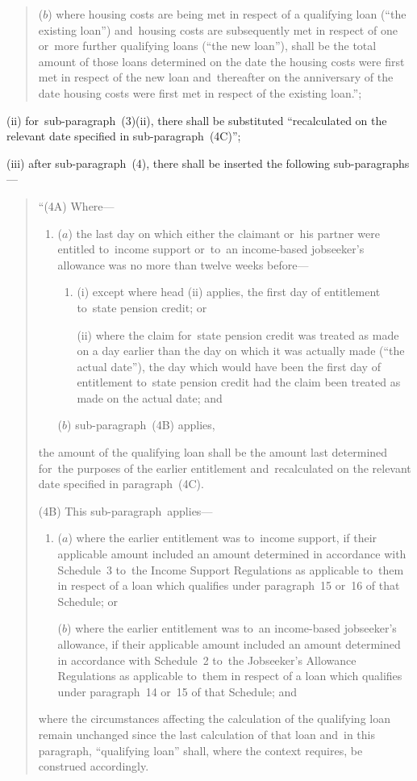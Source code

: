 \documentclass[12pt,a4paper]{article}
\begin{document}
\begin{enumerate}
\begin{enumerate}
\begin{quotation}
\begin{enumerate}
($b$) where housing costs are being met in respect of a qualifying loan (“the existing loan”) and~housing costs are subsequently met in respect of one or~more further qualifying loans (“the new loan”), shall be the total amount of those loans determined on the date the housing costs were first met in respect of the new loan and~thereafter on the anniversary of the date housing costs were first met in respect of the existing loan.”;
\end{enumerate}
\end{quotation}

(ii) for~sub-paragraph~(3)(ii), there shall be substituted “recalculated on the relevant date specified in sub-paragraph~(4C)”;

(iii) after sub-paragraph~(4), there shall be inserted the following sub-paragraphs—
\begin{quotation}
“(4A) Where—
\begin{enumerate}\item[]
($a$) the last day on which either the claimant or~his partner were entitled to~income support or~to~an income-based jobseeker’s allowance was no more than twelve weeks before—
\begin{enumerate}\item[]
(i) except where head (ii)  applies, the first day of entitlement to~state pension credit; or

(ii) where the claim for~state pension credit was treated as made on a day earlier than the day on which it was actually made (“the actual date”), the day which would have been the first day of entitlement to~state pension credit had the claim been treated as made on the actual date; and
\end{enumerate}

($b$) sub-paragraph~(4B) applies,
\end{enumerate}
the amount of the qualifying loan shall be the amount last determined for~the purposes of the earlier entitlement and~recalculated on the relevant date specified in paragraph~(4C).

(4B) This sub-paragraph~applies—
\begin{enumerate}\item[]
($a$) where the earlier entitlement was to~income support, if their applicable amount included an amount determined in accordance with Schedule~3 to~the Income Support Regulations as applicable to~them in respect of a loan which qualifies under paragraph~15 or~16 of that Schedule; or

($b$) where the earlier entitlement was to~an income-based jobseeker’s allowance, if their applicable amount included an amount determined in accordance with Schedule~2 to~the Jobseeker’s Allowance Regulations as applicable to~them in respect of a loan which qualifies under paragraph~14 or~15 of that Schedule; and
\end{enumerate}
where the circumstances affecting the calculation of the qualifying loan remain unchanged since the last calculation of that loan and~in this paragraph, “qualifying loan” shall, where the context requires, be construed accordingly.


\end{quotation}
\end{enumerate}
\end{enumerate}
\end{document}
